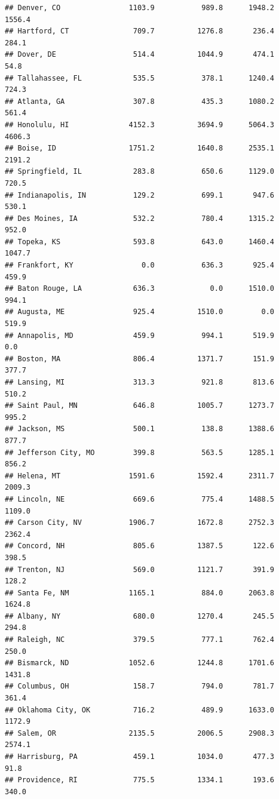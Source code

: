 \documentclass[
]{article}
\begin{document}
\begin{verbatim}
## Denver, CO                1103.9           989.8      1948.2        1556.4
## Hartford, CT               709.7          1276.8       236.4         284.1
## Dover, DE                  514.4          1044.9       474.1          54.8
## Tallahassee, FL            535.5           378.1      1240.4         724.3
## Atlanta, GA                307.8           435.3      1080.2         561.4
## Honolulu, HI              4152.3          3694.9      5064.3        4606.3
## Boise, ID                 1751.2          1640.8      2535.1        2191.2
## Springfield, IL            283.8           650.6      1129.0         720.5
## Indianapolis, IN           129.2           699.1       947.6         530.1
## Des Moines, IA             532.2           780.4      1315.2         952.0
## Topeka, KS                 593.8           643.0      1460.4        1047.7
## Frankfort, KY                0.0           636.3       925.4         459.9
## Baton Rouge, LA            636.3             0.0      1510.0         994.1
## Augusta, ME                925.4          1510.0         0.0         519.9
## Annapolis, MD              459.9           994.1       519.9           0.0
## Boston, MA                 806.4          1371.7       151.9         377.7
## Lansing, MI                313.3           921.8       813.6         510.2
## Saint Paul, MN             646.8          1005.7      1273.7         995.2
## Jackson, MS                500.1           138.8      1388.6         877.7
## Jefferson City, MO         399.8           563.5      1285.1         856.2
## Helena, MT                1591.6          1592.4      2311.7        2009.3
## Lincoln, NE                669.6           775.4      1488.5        1109.0
## Carson City, NV           1906.7          1672.8      2752.3        2362.4
## Concord, NH                805.6          1387.5       122.6         398.5
## Trenton, NJ                569.0          1121.7       391.9         128.2
## Santa Fe, NM              1165.1           884.0      2063.8        1624.8
## Albany, NY                 680.0          1270.4       245.5         294.8
## Raleigh, NC                379.5           777.1       762.4         250.0
## Bismarck, ND              1052.6          1244.8      1701.6        1431.8
## Columbus, OH               158.7           794.0       781.7         361.4
## Oklahoma City, OK          716.2           489.9      1633.0        1172.9
## Salem, OR                 2135.5          2006.5      2908.3        2574.1
## Harrisburg, PA             459.1          1034.0       477.3          91.8
## Providence, RI             775.5          1334.1       193.6         340.0

\end{verbatim}
\end{document}
